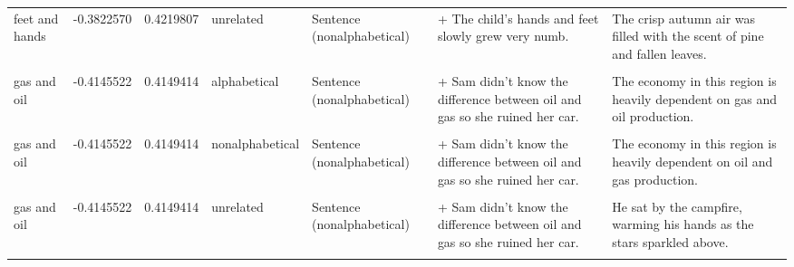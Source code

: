 \documentclass[
  12pt,
]{scrartcl}
\begin{document}
\begin{landscape}
\begin{longtable}{lrrllll}
feet and hands & -0.3822570 & 0.4219807 & unrelated & Sentence (nonalphabetical) & + The child's hands and feet slowly grew very numb. & The crisp autumn air was filled with the scent of pine and fallen leaves.\\
\addlinespace
\cellcolor{gray!6}{gas and oil} & \cellcolor{gray!6}{-0.4145522} & \cellcolor{gray!6}{0.4149414} & \cellcolor{gray!6}{alphabetical} & \cellcolor{gray!6}{Sentence (alphabetical)} & \cellcolor{gray!6}{+ Sam didn't know the difference between gas and oil so she ruined her car.} & \cellcolor{gray!6}{The economy in this region is heavily dependent on gas and oil production.}\\
gas and oil & -0.4145522 & 0.4149414 & alphabetical & Sentence (nonalphabetical) & + Sam didn't know the difference between oil and gas so she ruined her car. & The economy in this region is heavily dependent on gas and oil production.\\
\cellcolor{gray!6}{gas and oil} & \cellcolor{gray!6}{-0.4145522} & \cellcolor{gray!6}{0.4149414} & \cellcolor{gray!6}{nonalphabetical} & \cellcolor{gray!6}{Sentence (alphabetical)} & \cellcolor{gray!6}{+ Sam didn't know the difference between gas and oil so she ruined her car.} & \cellcolor{gray!6}{The economy in this region is heavily dependent on oil and gas production.}\\
gas and oil & -0.4145522 & 0.4149414 & nonalphabetical & Sentence (nonalphabetical) & + Sam didn't know the difference between oil and gas so she ruined her car. & The economy in this region is heavily dependent on oil and gas production.\\
\cellcolor{gray!6}{gas and oil} & \cellcolor{gray!6}{-0.4145522} & \cellcolor{gray!6}{0.4149414} & \cellcolor{gray!6}{unrelated} & \cellcolor{gray!6}{Sentence (alphabetical)} & \cellcolor{gray!6}{+ Sam didn't know the difference between gas and oil so she ruined her car.} & \cellcolor{gray!6}{He sat by the campfire, warming his hands as the stars sparkled above.}\\
\addlinespace
gas and oil & -0.4145522 & 0.4149414 & unrelated & Sentence (nonalphabetical) & + Sam didn't know the difference between oil and gas so she ruined her car. & He sat by the campfire, warming his hands as the stars sparkled above.\\
\cellcolor{gray!6}{death and life} & \cellcolor{gray!6}{-0.4380721} & \cellcolor{gray!6}{0.1047131} & \cellcolor{gray!6}{alphabetical} & \cellcolor{gray!6}{Sentence (alphabetical)} & \cellcolor{gray!6}{+ It is hard to tell the difference between death and life when you are in purgatory.} & \cellcolor{gray!6}{In many cultures, death and life are seen as intertwined parts of a greater cycle.}\\

\end{longtable}
\end{landscape}
\end{document}
